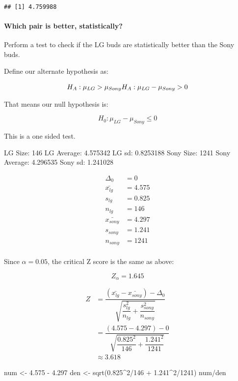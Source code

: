 \documentclass[
]{article}
\newenvironment{Shaded}{\begin{snugshade}}{\end{snugshade}}
\newcommand{\DecValTok}[1]{\textcolor[rgb]{0.86,0.86,0.80}{#1}}
\newcommand{\FloatTok}[1]{\textcolor[rgb]{0.75,0.75,0.82}{#1}}
\newcommand{\FunctionTok}[1]{\textcolor[rgb]{0.94,0.94,0.56}{#1}}
\newcommand{\NormalTok}[1]{\textcolor[rgb]{0.80,0.80,0.80}{#1}}
\newcommand{\OtherTok}[1]{\textcolor[rgb]{0.94,0.94,0.56}{#1}}
\newcommand{\SpecialCharTok}[1]{\textcolor[rgb]{0.86,0.64,0.64}{#1}}
\begin{document}
\begin{verbatim}
## [1] 4.759988
\end{verbatim}

\hypertarget{which-pair-is-better-statistically}{%
\paragraph{Which pair is better,
statistically?}\label{which-pair-is-better-statistically}}

Perform a test to check if the LG buds are statistically better than the
Sony buds.

Define our alternate hypothesis as:

\[
H_A: \mu_{LG} > \mu_{Sony}\\
H_A: \mu_{LG} - \mu_{Sony} > 0
\]

That means our null hypothesis is:

\[
H_0: \mu_{LG} - \mu_{Sony} \leq 0
\]

This is a one sided test.

LG Size: 146 LG Average: 4.575342 LG sd: 0.8253188 Sony Size: 1241 Sony
Average: 4.296535 Sony sd: 1.241028

\[
\begin{aligned}
\Delta_0 &= 0 \\
\bar{x_{lg}} &=  4.575\\
s_{lg} &= 0.825\\
n_{lg} &= 146\\
\bar{x_{sony}} &= 4.297\\
s_{sony} &= 1.241\\
n_{sony} &= 1241\\
\end{aligned}
\]

Since \(\alpha = 0.05\), the critical Z score is the same as above:

\[
Z_\alpha = 1.645
\]

\[
\begin{aligned}
Z &= \dfrac{(\bar{x_{lg}} - \bar{x_{sony}})-\Delta_0}{\sqrt{\dfrac{s_{lg}^2}{n_{lg}}+\dfrac{s_{sony}^2}{n_{sony}}}}\\
&= \dfrac{(4.575 - 4.297) - 0}{\sqrt{\dfrac{0.825^2}{146}+\dfrac{1.241^2}{1241}}}\\
&\approx 3.618
\end{aligned}
\]

\begin{Shaded}
\begin{Highlighting}[]
\NormalTok{num }\OtherTok{\textless{}{-}} \FloatTok{4.575} \SpecialCharTok{{-}} \FloatTok{4.297}
\NormalTok{den }\OtherTok{\textless{}{-}} \FunctionTok{sqrt}\NormalTok{(}\FloatTok{0.825}\SpecialCharTok{\^{}}\DecValTok{2}\SpecialCharTok{/}\DecValTok{146} \SpecialCharTok{+} \FloatTok{1.241}\SpecialCharTok{\^{}}\DecValTok{2}\SpecialCharTok{/}\DecValTok{1241}\NormalTok{)}
\NormalTok{num}\SpecialCharTok{/}\NormalTok{den}
\end{Highlighting}
\end{Shaded}
\end{document}
